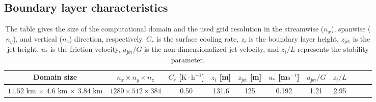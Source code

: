 \documentclass[%
 aip,
 amsmath,amssymb,
reprint,
twocolumn,%
author-numerical,%
]{revtex4-1}
\begin{document}
\subsection{Boundary layer characteristics}\label{sec2.3} 
\begin{table} 
 \begin{center}
 \caption{The table gives the size of the computational domain and the used grid resolution in the streamwise ($n_x$), spanwise ($n_y$), and vertical ($n_z$) direction, respectively. $C_r$ is the surface cooling rate, $z_i$ is the boundary layer height, $z_\text{jet}$ is the jet height, $u_*$ is the friction velocity, $u_\text{jet}/G$ is the non-dimensionalized jet velocity, and $z_i/L$ represents the stability parameter.}
 \begin{tabular}{|c|c|c|c|c|c|c|c|c|c|c|}
 \hline
 Domain size & $n_x \times n_y \times n_z$ & $C_r$ [$\text{K}\cdot\text{h}^{-1}$] & $z_i$ [m] & $z_\text{jet}$ [m] & $u_*$ [m$\text{s}^{-1}$]& $u_\text{jet}/G$ & $z_i/L$ \\[3pt]
 \hline
$11.52$ $\text{km}$ $\times$ $4.6$ $\text{km}$ $\times$ $3.84$ $\text{km}$ & $1280\times512\times384$& 0.50 & 131.6 & 125 & 0.192 & 1.21 & 2.95\\
\hline
 \end{tabular}
\label{table1}
\end{center}
\end{table}
\end{document}
